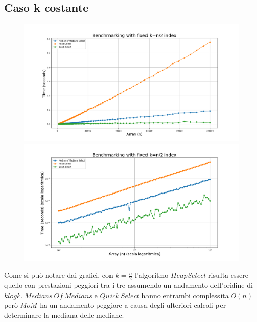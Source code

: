 \documentclass[a4paper]{article}
\begin{document}
\subsection{Caso k costante}
\begin{figure}[h]
            \centering
            \includegraphics[width=.83\textwidth]{graphs/k_const_n.png}
            \includegraphics[width=.83\textwidth]{graphs/k_const_2xlog.png}
\end{figure}
Come si può notare dai grafici, con $k=\frac{n}{2}$ l'algoritmo $HeapSelect$ risulta essere quello con prestazioni peggiori tra i tre assumendo un andamento dell'oridine di $klogk$.
$Medians\ Of\ Medians$ e $Quick\ Select$ hanno entrambi complessita $O(n)$ però $MoM$ ha un andamento peggiore a causa degli ulteriori calcoli per determinare la mediana delle mediane.\\
\newpage
\end{document}
